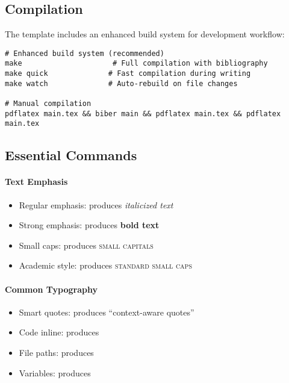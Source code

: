 \documentclass[11pt]{article}
\begin{document}
\subsection{Compilation}

The template includes an enhanced build system for development workflow:

\begin{verbatim}
# Enhanced build system (recommended)
make                     # Full compilation with bibliography
make quick              # Fast compilation during writing  
make watch              # Auto-rebuild on file changes

# Manual compilation  
pdflatex main.tex && biber main && pdflatex main.tex && pdflatex main.tex
\end{verbatim}

\subsection{Essential Commands}

\paragraph{Text Emphasis}
\begin{itemize}
\item Regular emphasis:  produces \emph{italicized text}
\item Strong emphasis:  produces \textbf{bold text}
\item Small caps:  produces \textsc{small capitals}
\item Academic style:  produces \textsc{standard small caps}
\end{itemize}

\paragraph{Common Typography}
\begin{itemize}
\item Smart quotes:  produces \enquote{context-aware quotes}
\item Code inline:  produces 
\item File paths:  produces 
\item Variables:  produces 
\end{itemize}
\end{document}
